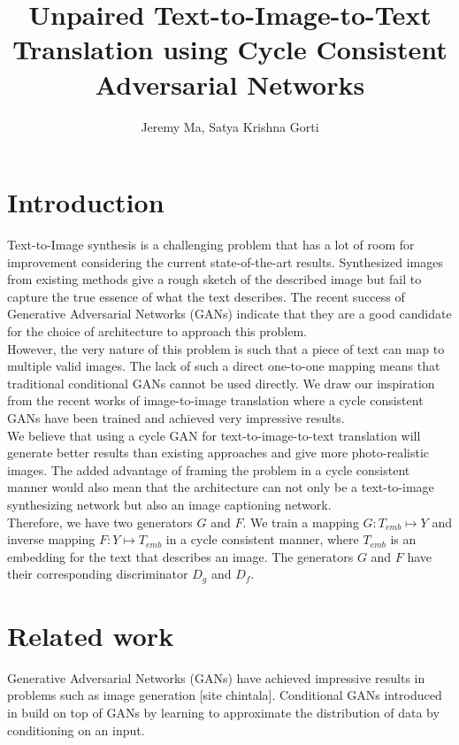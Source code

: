 \documentclass[]{article}
\title{Unpaired Text-to-Image-to-Text Translation using Cycle Consistent Adversarial Networks}
\author{Jeremy Ma, Satya Krishna Gorti}
\date{}
\begin{document}
\maketitle


\section{Introduction}

Text-to-Image synthesis is a challenging problem that has a lot of room for improvement considering the current state-of-the-art results. Synthesized images from existing methods give a rough sketch of the described image but fail to capture the true essence of what the text describes. The recent success of Generative Adversarial Networks (GANs) \cite{goodfellow2014generative} indicate that they are a good candidate for the choice of architecture to approach this problem.
\\

However, the very nature of this problem is such that a piece of text can map to multiple valid images. The lack of such a direct one-to-one mapping means that traditional conditional GANs \cite{mirza2014conditional} cannot be used directly. We draw our inspiration from the recent works of image-to-image translation \cite{liu2017unsupervised}\cite{zhu2017unpaired} where a cycle consistent GANs have been trained and achieved very impressive results.
\\

We believe that using a cycle GAN for text-to-image-to-text translation will generate better results than existing approaches and give more photo-realistic images. The added advantage of framing the problem in a cycle consistent manner would also mean that the architecture can not only be a text-to-image synthesizing network but also an image captioning network.
\\

Therefore, we have two generators $G$ and $F$. We train a mapping $G: T_{emb} \mapsto Y$ and inverse mapping $F: Y \mapsto T_{emb}$ in a cycle consistent manner, where $T_{emb}$ is an embedding for the text that describes an image. The generators $G$ and $F$ have their corresponding discriminator $D_g$ and $D_f$.

\section{Related work}

Generative Adversarial Networks (GANs) have achieved impressive results in problems such as image generation [site chintala]. Conditional GANs introduced in \cite{mirza2014conditional} build on top of GANs by learning to approximate the distribution of data by conditioning on an input.
\\
\end{document}
